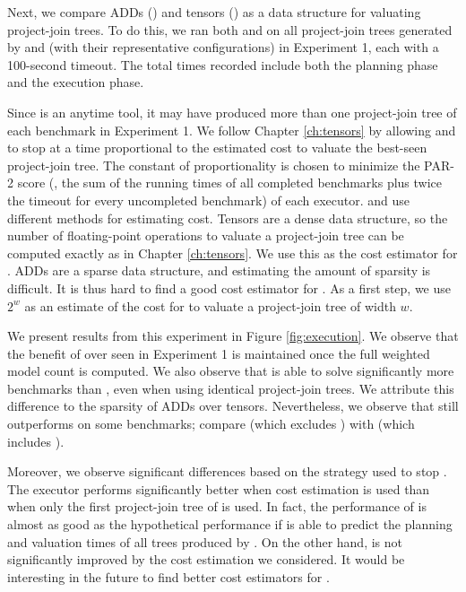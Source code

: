 Next, we compare ADDs (\Dmc) and tensors (\Tensor) as a data structure for valuating project-join trees.
To do this, we ran both \Dmc{} and \Tensor{} on all project-join trees generated by \Htb{} and \Lg{} (with their representative configurations) in Experiment 1, each with a 100-second timeout.
The total times recorded include both the planning phase and the execution phase.

Since \Lg{} is an anytime tool, it may have produced more than one project-join tree of each benchmark in Experiment 1.
We follow Chapter \ref{ch:tensors} by allowing \Tensor{} and \Dmc{} to stop \Lg{} at a time proportional to the estimated cost to valuate the best-seen project-join tree.
The constant of proportionality is chosen to minimize the PAR-2 score (\ie, the sum of the running times of all completed benchmarks plus twice the timeout for every uncompleted benchmark) of each executor.
\Tensor{} and \Dmc{} use different methods for estimating cost.
Tensors are a dense data structure, so the number of floating-point operations to valuate a project-join tree can be computed exactly as in Chapter \ref{ch:tensors}.
We use this as the cost estimator for \Tensor{}.
ADDs are a sparse data structure, and estimating the amount of sparsity is difficult.
It is thus hard to find a good cost estimator for \Dmc{}.
As a first step, we use $2^w$ as an estimate of the cost for \Dmc{} to valuate a project-join tree of width $w$.

We present results from this experiment in Figure \ref{fig:execution}.
We observe that the benefit of \Lg{} over \Htb{} seen in Experiment 1 is maintained once the full weighted model count is computed.
We also observe that \Dmc{} is able to solve significantly more benchmarks than \Tensor{}, even when using identical project-join trees.
We attribute this difference to the sparsity of ADDs over tensors.
Nevertheless, we observe that \Tensor{} still outperforms \Dmc{} on some benchmarks; compare  (which excludes \Tensor{}) with  (which includes \Tensor{}).

Moreover, we observe significant differences based on the strategy used to stop \Lg{}.
The executor \Tensor{} performs significantly better when cost estimation is used than when only the first project-join tree of \Lg{} is used.
In fact, the performance of \Tensor{} is almost as good as the hypothetical performance if \Tensor{} is able to predict the planning and valuation times of all trees produced by \Lg{}.
On the other hand, \Dmc{} is not significantly improved by the cost estimation we considered.
It would be interesting in the future to find better cost estimators for \Dmc{}.

